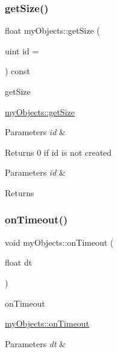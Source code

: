 \subsubsection{\texorpdfstring{get\+Size()}{getSize()}}
{\footnotesize\ttfamily float my\+Objects\+::get\+Size (\begin{DoxyParamCaption}\item[{uint}]{id = {} }\end{DoxyParamCaption}) const}



get\+Size 

\hyperlink{classmyObjects_ad5181c0f75a5cbadbff0022402ae448d}{my\+Objects\+::get\+Size}


\begin{DoxyParams}{Parameters}
{\em id} & \\
\hline
\end{DoxyParams}
\begin{DoxyReturn}{Returns}
0 if id is not created
\end{DoxyReturn}

\begin{DoxyParams}{Parameters}
{\em id} & \\
\hline
\end{DoxyParams}
\begin{DoxyReturn}{Returns}

\end{DoxyReturn}
\mbox{\label{classmyObjects_abe3e3cf13ae4534f3c19701d65d4ccc3}} 
\subsubsection{\texorpdfstring{on\+Timeout()}{onTimeout()}}
{\footnotesize\ttfamily void my\+Objects\+::on\+Timeout (\begin{DoxyParamCaption}\item[{float}]{dt }\end{DoxyParamCaption})\hspace{0.3cm}{\ttfamily [virtual]}}



on\+Timeout 

\hyperlink{classmyObjects_abe3e3cf13ae4534f3c19701d65d4ccc3}{my\+Objects\+::on\+Timeout}


\begin{DoxyParams}{Parameters}
{\em dt} & \\
\hline
\end{DoxyParams}
\mbox{\label{classmyObjects_a031a16bfe7b2bfdbf8207cd76cbf9ffd}} 
